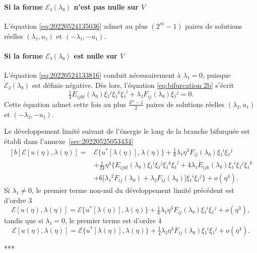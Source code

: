 \documentclass[12pt, final]{amsart}
\theoremstyle{definition}
\begin{document}
\paragraph{Si la forme \(ℰ₃(λ₀)\) n'est pas nulle sur \(V\)} L'équation
\eqref{eq:20220524135036} admet au plus \((2^m - 1)\) paires de solutions
réelles \((λ₁, u₁)\) et \((- λ₁, - u₁)\). 

\paragraph{Si la forme \(ℰ₃(λ₀)\) est nulle sur \(V\)} L'équation
\eqref{eq:20220524133816} conduit nécessairement à \(λ₁ = 0\), puisque
\(\dot{ℰ}₂(λ₀)\) est définie négative. Dès lors, l'équation
\eqref{eq:bifurcation 2b} s'écrit 
\begin{equation}
 \tfrac{1}{3} E_{ijkl}(λ₀) ξ₁^j ξ₁^k ξ₁^l + λ₂ F_{ij}(λ₀) ξ₁^j = 0.
\end{equation}
Cette équation admet cette fois au plus \(\frac{3^m - 1}{2}\) paires de
solutions réelles \((λ₂, u₁)\) et \((- λ₂, - u₁)\). 

Le développement limité suivant de l'énergie le long de la branche bifurquée est
établi dans l'annexe~\ref{sec:20220525053434}
\begin{equation}
  \label{eq:20220525053600}
  \begin{aligned}[b]
    ℰ[u(η), λ(η)] ={}
    & ℰ\{u^{\ast}[λ(η)], λ(η)\} + \tfrac{1}{6} λ₁ η^3 F_{i j}(λ₀) ξ₁^i ξ₁^j\\
    & + \tfrac{1}{24} η^4 \bigl\{E_{ijkl}(λ₀) ξ₁^i ξ₁^j ξ₁^k ξ₁^l + 4λ₁ \dot{E}_{ijk}(λ₀) ξ₁^i ξ₁^j ξ₁^k\\
    & + 6 \bigl[λ₁^2 \dot{F}_{ij}(λ₀) + λ₂ F_{ij}(λ₀)\bigr] ξ₁^i ξ₁^j\bigr\} + o(η^4).
  \end{aligned}
\end{equation}
Si \(λ₁ ≠ 0\), le premier terme non-nul du développement limité précédent est
d'ordre 3
\begin{equation}
 ℰ [u(η), λ(η)] = ℰ\{u^{\ast}[λ(η)], λ(η)\} + \tfrac{1}{6} λ₁ η^3 F_{ij}(λ₀) ξ₁^i ξ₁^j + o(η^3),
\end{equation}
tandis que si \(λ₁ = 0\), le premier terme est d'ordre 4
\begin{equation}
 ℰ[u(η), λ(η)] = ℰ\{u^{\ast} [λ(η)], λ(η)\} + \tfrac{1}{4} λ₂ η^4 F_{ij}(λ₀) ξ₁^i ξ₁^j + o(η^4).
\end{equation}
\begin{center}
 ***
\end{center}
\end{document}
